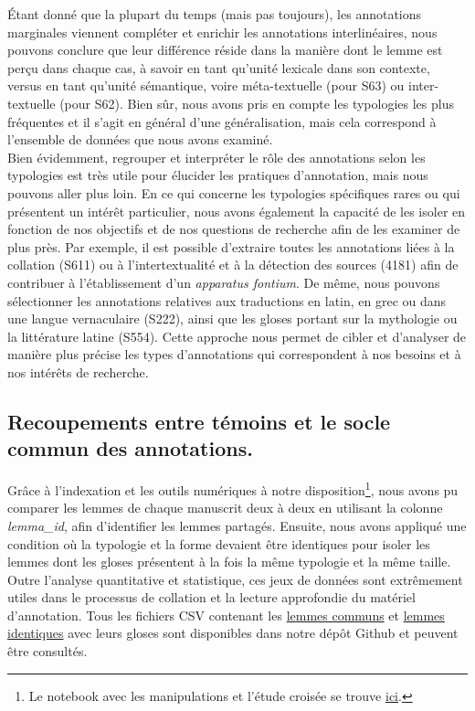 \documentclass[a4paper, twoside, 12pt]{book}
\begin{document}
{Étant donné que la plupart du temps (mais pas toujours), les annotations marginales viennent compléter et enrichir les annotations interlinéaires, nous pouvons conclure que leur différence réside dans la manière dont le lemme est perçu dans chaque cas, à savoir en tant qu'unité lexicale dans son contexte, versus en tant qu'unité sémantique, voire méta-textuelle (pour S63) ou inter-textuelle (pour S62). Bien sûr, nous avons pris en compte les typologies les plus fréquentes et il s'agit en général d'une généralisation, mais cela correspond à l'ensemble de données que nous avons examiné.\\

Bien évidemment, regrouper et interpréter le rôle des annotations selon les typologies est très utile pour élucider les pratiques d'annotation, mais nous pouvons aller plus loin. En ce qui concerne les typologies spécifiques rares ou qui présentent un intérêt particulier, nous avons également la capacité de les isoler en fonction de nos objectifs et de nos questions de recherche afin de les examiner de plus près. Par exemple, il est possible d'extraire toutes les annotations liées à la collation (S611) ou à l'intertextualité et à la détection des sources (4181) afin de contribuer à l'établissement d'un \textit{apparatus fontium}. De même, nous pouvons sélectionner les annotations relatives aux traductions en latin, en grec ou dans une langue vernaculaire (S222), ainsi que les gloses portant sur la mythologie ou la littérature latine (S554). Cette approche nous permet de cibler et d'analyser de manière plus précise les types d'annotations qui correspondent à nos besoins et à nos intérêts de recherche.


\subsection{Recoupements entre témoins et le \og{}socle commun\fg{} des annotations.}

Grâce à l'indexation et les outils numériques à notre disposition\footnote{Le notebook avec les manipulations et l'étude croisée se trouve \href{https://github.com/malamatenia/Eutyches/tree/main/comparative_mss_analysis}{ici}.}, nous avons pu comparer les lemmes de chaque manuscrit deux à deux en utilisant la colonne \textit{lemma\_id}, afin d'identifier les lemmes partagés. Ensuite, nous avons appliqué une condition où la typologie et la forme devaient être identiques pour isoler les lemmes dont les gloses présentent à la fois la même typologie et la même taille. Outre l'analyse quantitative et statistique, ces jeux de données sont extrêmement utiles dans le processus de collation et la lecture approfondie du matériel d'annotation. Tous les fichiers CSV contenant les \href{https://github.com/malamatenia/Eutyches/tree/main/comparative_mss_analysis/common_lemmas_csv}{lemmes communs} et \href{https://github.com/malamatenia/Eutyches/tree/main/comparative_mss_analysis/identical_glosses_csv}{lemmes identiques} avec leurs gloses sont disponibles dans notre dépôt Github et peuvent être consultés.\\


}
\end{document}
